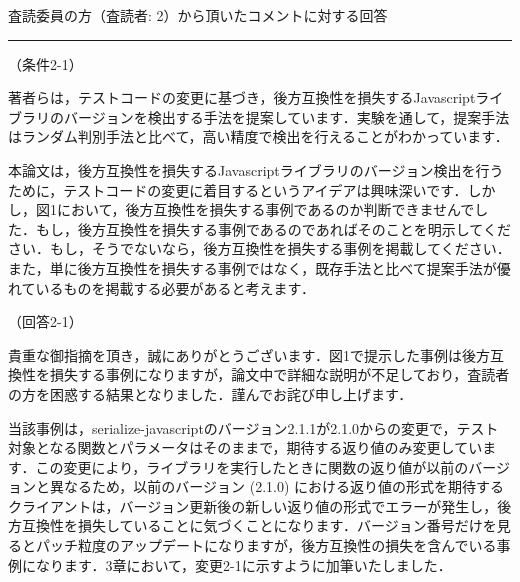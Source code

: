 \documentclass{jarticle} %
\def\section#1{ \vspace{3pc} {\large \gt #1} \vspace{1pc} \hrule }
\def\subsection#1{ \vspace{1pc} {\gt #1} }
\begin{document}
\newpage
\section{査読委員の方（査読者: 2）から頂いたコメントに対する回答}
\subsection{（条件2-1）}

著者らは，テストコードの変更に基づき，後方互換性を損失するJavascriptライブラリのバージョンを検出する手法を提案しています．実験を通して，提案手法はランダム判別手法と比べて，高い精度で検出を行えることがわかっています．

本論文は，後方互換性を損失するJavascriptライブラリのバージョン検出を行うために，テストコードの変更に着目するというアイデアは興味深いです．しかし，図1において，後方互換性を損失する事例であるのか判断できませんでした．もし，後方互換性を損失する事例であるのであればそのことを明示してください．もし，そうでないなら，後方互換性を損失する事例を掲載してください．また，単に後方互換性を損失する事例ではなく，既存手法と比べて提案手法が優れているものを掲載する必要があると考えます．


\subsection{（回答2-1）}

貴重な御指摘を頂き，誠にありがとうございます．図1で提示した事例は後方互換性を損失する事例になりますが，論文中で詳細な説明が不足しており，査読者の方を困惑する結果となりました．謹んでお詫び申し上げます．

当該事例は，serialize-javascriptのバージョン2.1.1が2.1.0からの変更で，テスト対象となる関数とパラメータはそのままで，期待する返り値のみ変更しています．この変更により，ライブラリを実行したときに関数の返り値が以前のバージョンと異なるため，以前のバージョン (2.1.0) における返り値の形式を期待するクライアントは，バージョン更新後の新しい返り値の形式でエラーが発生し，後方互換性を損失していることに気づくことになります．バージョン番号だけを見るとパッチ粒度のアップデートになりますが，後方互換性の損失を含んでいる事例になります．3章において，変更2-1に示すように加筆いたしました．
\end{document}
